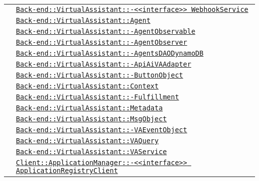 \begin{longtable}{|>{\centering}m{3cm}|m{10cm}<{\centering}|}
& \hyperref[Back-end::VirtualAssistant::<<interface>> WebhookService]{\texttt{Back-end::VirtualAssistant::-\linebreak <<interface>> WebhookService}}\\
& \hyperref[Back-end::VirtualAssistant::Agent]{\texttt{Back-end::VirtualAssistant::Agent}}\\
& \hyperref[Back-end::VirtualAssistant::AgentObservable]{\texttt{Back-end::VirtualAssistant::-\linebreak AgentObservable}}\\
& \hyperref[Back-end::VirtualAssistant::AgentObserver]{\texttt{Back-end::VirtualAssistant::-\linebreak AgentObserver}}\\
& \hyperref[Back-end::VirtualAssistant::AgentsDAODynamoDB]{\texttt{Back-end::VirtualAssistant::-\linebreak AgentsDAODynamoDB}}\\
& \hyperref[Back-end::VirtualAssistant::ApiAiVAAdapter]{\texttt{Back-end::VirtualAssistant::-\linebreak ApiAiVAAdapter}}\\
& \hyperref[Back-end::VirtualAssistant::ButtonObject]{\texttt{Back-end::VirtualAssistant::-\linebreak ButtonObject}}\\
& \hyperref[Back-end::VirtualAssistant::Context]{\texttt{Back-end::VirtualAssistant::Context}}\\
& \hyperref[Back-end::VirtualAssistant::Fulfillment]{\texttt{Back-end::VirtualAssistant::-\linebreak Fulfillment}}\\
& \hyperref[Back-end::VirtualAssistant::Metadata]{\texttt{Back-end::VirtualAssistant::Metadata}}\\
& \hyperref[Back-end::VirtualAssistant::MsgObject]{\texttt{Back-end::VirtualAssistant::MsgObject}}\\
& \hyperref[Back-end::VirtualAssistant::VAEventObject]{\texttt{Back-end::VirtualAssistant::-\linebreak VAEventObject}}\\
& \hyperref[Back-end::VirtualAssistant::VAQuery]{\texttt{Back-end::VirtualAssistant::VAQuery}}\\
& \hyperref[Back-end::VirtualAssistant::VAService]{\texttt{Back-end::VirtualAssistant::VAService}}\\
& \hyperref[Client::ApplicationManager::<<interface>> ApplicationRegistryClient]{\texttt{Client::ApplicationManager::-\linebreak <<interface>> ApplicationRegistryClient}}\\

\end{longtable}
